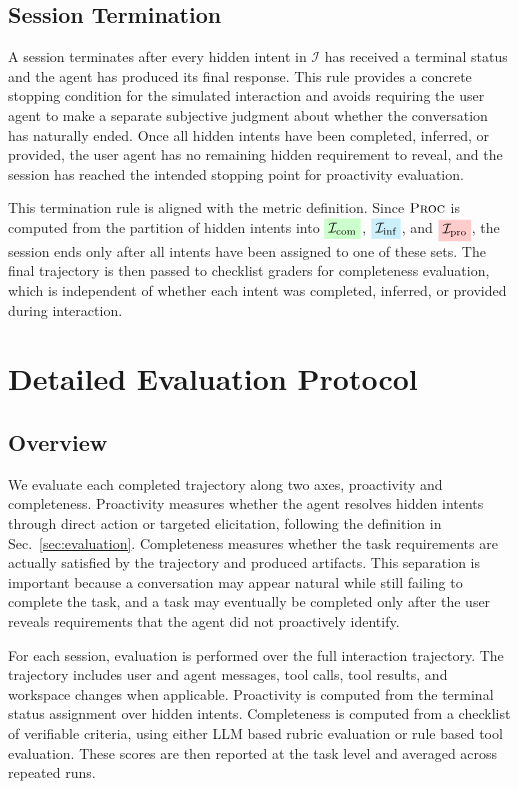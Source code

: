 \documentclass{llmxive}
\providecommand{\intentcompleted}{\colorbox{green!20}{$\mathcal{I}_\text{com}$}}
\providecommand{\intentinferred}{\colorbox{cyan!20}{$\mathcal{I}_\text{inf}$}}
\providecommand{\intentprovided}{\colorbox{red!20}{$\mathcal{I}_\text{pro}$}}
\begin{document}
\subsection{Session Termination}
\label{app:user_agent_termination}

A session terminates after every hidden intent in $\mathcal{I}$ has received a terminal status and the agent has produced its final response. This rule provides a concrete stopping condition for the simulated interaction and avoids requiring the user agent to make a separate subjective judgment about whether the conversation has naturally ended. Once all hidden intents have been completed, inferred, or provided, the user agent has no remaining hidden requirement to reveal, and the session has reached the intended stopping point for proactivity evaluation.

This termination rule is aligned with the metric definition. Since $\textsc{Proc}$ is computed from the partition of hidden intents into $\intentcompleted$, $\intentinferred$, and $\intentprovided$, the session ends only after all intents have been assigned to one of these sets. The final trajectory is then passed to checklist graders for completeness evaluation, which is independent of whether each intent was completed, inferred, or provided during interaction.

\section{Detailed Evaluation Protocol}
\label{app:detailed_evaluation}

\subsection{Overview}
\label{app:eval_overview}

We evaluate each completed trajectory along two axes, proactivity and completeness. Proactivity measures whether the agent resolves hidden intents through direct action or targeted elicitation, following the definition in Sec.~\ref{sec:evaluation}. Completeness measures whether the task requirements are actually satisfied by the trajectory and produced artifacts. This separation is important because a conversation may appear natural while still failing to complete the task, and a task may eventually be completed only after the user reveals requirements that the agent did not proactively identify.

For each session, evaluation is performed over the full interaction trajectory. The trajectory includes user and agent messages, tool calls, tool results, and workspace changes when applicable. Proactivity is computed from the terminal status assignment over hidden intents. Completeness is computed from a checklist of verifiable criteria, using either LLM based rubric evaluation or rule based tool evaluation. These scores are then reported at the task level and averaged across repeated runs.
\end{document}
